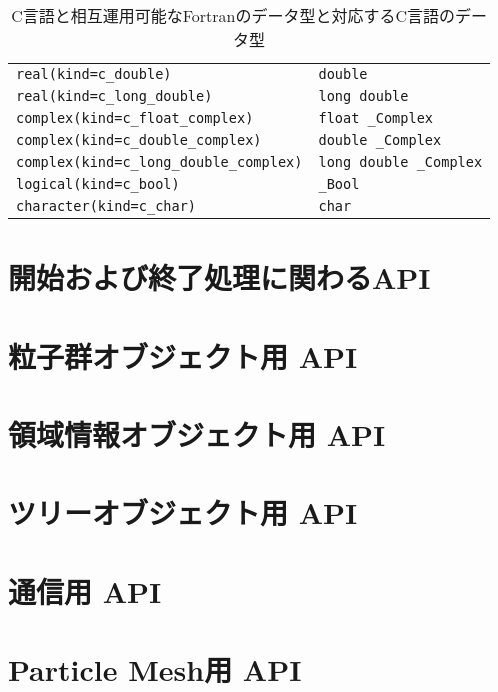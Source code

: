 \documentclass[12pt,a4paper,dvipdfmx]{jbook} %
\begin{document}
\begin{table}[H]
\begin{tabularx}{\linewidth}{XX}
\texttt{real(kind=c\_double)}                   & \texttt{double}\\
\texttt{real(kind=c\_long\_double)}             & \texttt{long double}\\
\texttt{complex(kind=c\_float\_complex)}        & \texttt{float \_Complex}\\
\texttt{complex(kind=c\_double\_complex)}       & \texttt{double \_Complex}\\
\texttt{complex(kind=c\_long\_double\_complex)} & \texttt{long double \_Complex}\\
\texttt{logical(kind=c\_bool)}                  & \texttt{\_Bool}\\
\texttt{character(kind=c\_char)}                & \texttt{char}\\
\bottomrule
\end{tabularx}
\caption{C言語と相互運用可能なFortranのデータ型と対応するC言語のデータ型}
\label{tbl:interoperable_data_types}
\end{table}
\clearpage



\section{開始および終了処理に関わるAPI}
\label{sec:initfin_APIs}

\newpage
\section{粒子群オブジェクト用 API}
\label{sec:psys_APIs}

\newpage
\section{領域情報オブジェクト用 API}
\label{sec:dinfo_APIs}

\newpage
\section{ツリーオブジェクト用 API}
\label{sec:tree_APIs}

\newpage
\section{通信用 API}
\label{sec:comm_APIs}

\newpage
\section{Particle Mesh用 API}
\label{sec:PM_APIs}

\newpage
\end{document}
